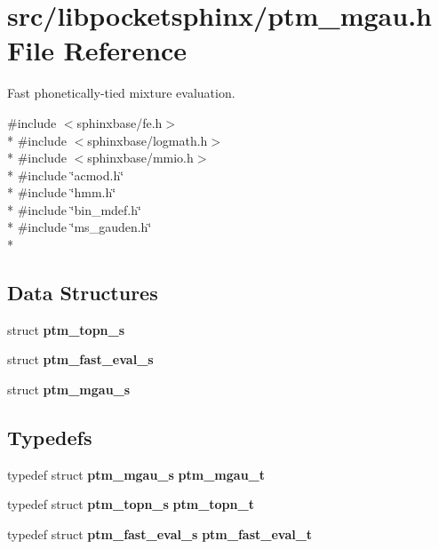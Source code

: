 \section{src/libpocketsphinx/ptm\+\_\+mgau.h File Reference}
\label{ptm__mgau_8h}


Fast phonetically-\/tied mixture evaluation.  


{\ttfamily \#include $<$sphinxbase/fe.\+h$>$}\\*
{\ttfamily \#include $<$sphinxbase/logmath.\+h$>$}\\*
{\ttfamily \#include $<$sphinxbase/mmio.\+h$>$}\\*
{\ttfamily \#include \char`\"{}acmod.\+h\char`\"{}}\\*
{\ttfamily \#include \char`\"{}hmm.\+h\char`\"{}}\\*
{\ttfamily \#include \char`\"{}bin\+\_\+mdef.\+h\char`\"{}}\\*
{\ttfamily \#include \char`\"{}ms\+\_\+gauden.\+h\char`\"{}}\\*
\subsection*{Data Structures}
\begin{DoxyCompactItemize}
\item 
struct {\bf ptm\+\_\+topn\+\_\+s}
\item 
struct {\bf ptm\+\_\+fast\+\_\+eval\+\_\+s}
\item 
struct {\bf ptm\+\_\+mgau\+\_\+s}
\end{DoxyCompactItemize}
\subsection*{Typedefs}
\begin{DoxyCompactItemize}
\item 
typedef struct {\bf ptm\+\_\+mgau\+\_\+s} {\bfseries ptm\+\_\+mgau\+\_\+t}\label{ptm__mgau_8h_ab1e3230da8b59628476ecdf70e97ec9a}

\item 
typedef struct {\bf ptm\+\_\+topn\+\_\+s} {\bfseries ptm\+\_\+topn\+\_\+t}\label{ptm__mgau_8h_a4542a2b38a0c0b8ea62432f63fa3c921}

\item 
typedef struct {\bf ptm\+\_\+fast\+\_\+eval\+\_\+s} {\bfseries ptm\+\_\+fast\+\_\+eval\+\_\+t}\label{ptm__mgau_8h_af870ed22578ba58631d06a1c01752ced}

\end{DoxyCompactItemize}
